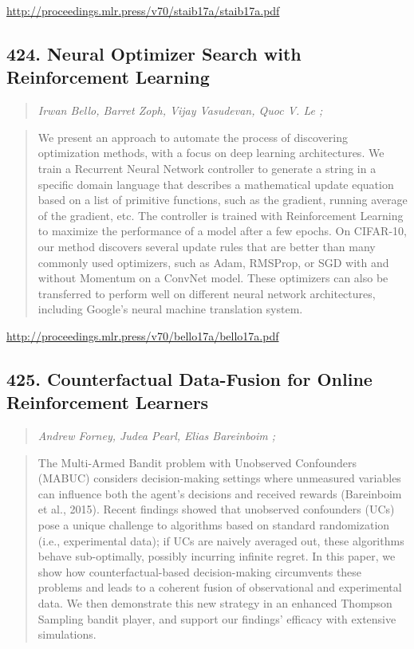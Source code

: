 \documentclass{article}
\begin{document}
\href{http://proceedings.mlr.press/v70/staib17a/staib17a.pdf}{http://proceedings.mlr.press/v70/staib17a/staib17a.pdf}

\subsection{424. Neural Optimizer Search with Reinforcement Learning}

\begin{quote}
\footnotesize{\textit{Irwan Bello, Barret Zoph, Vijay Vasudevan, Quoc V. Le ;}}
\end{quote}

\begin{quote}
    We present an approach to automate the process of discovering optimization methods, with a focus on deep learning architectures. We train a Recurrent Neural Network controller to generate a string in a specific domain language that describes a mathematical update equation based on a list of primitive functions, such as the gradient, running average of the gradient, etc. The controller is trained with Reinforcement Learning to maximize the performance of a model after a few epochs. On CIFAR-10, our method discovers several update rules that are better than many commonly used optimizers, such as Adam, RMSProp, or SGD with and without Momentum on a ConvNet model. These optimizers can also be transferred to perform well on different neural network architectures, including Google’s neural machine translation system.  \end{quote}

\href{http://proceedings.mlr.press/v70/bello17a/bello17a.pdf}{http://proceedings.mlr.press/v70/bello17a/bello17a.pdf}

\subsection{425. Counterfactual Data-Fusion for Online Reinforcement Learners}

\begin{quote}
\footnotesize{\textit{Andrew Forney, Judea Pearl, Elias Bareinboim ;}}
\end{quote}

\begin{quote}
    The Multi-Armed Bandit problem with Unobserved Confounders (MABUC) considers decision-making settings where unmeasured variables can influence both the agent’s decisions and received rewards (Bareinboim et al., 2015). Recent findings showed that unobserved confounders (UCs) pose a unique challenge to algorithms based on standard randomization (i.e., experimental data); if UCs are naively averaged out, these algorithms behave sub-optimally, possibly incurring infinite regret. In this paper, we show how counterfactual-based decision-making circumvents these problems and leads to a coherent fusion of observational and experimental data. We then demonstrate this new strategy in an enhanced Thompson Sampling bandit player, and support our findings’ efficacy with extensive simulations.  \end{quote}
\end{document}
